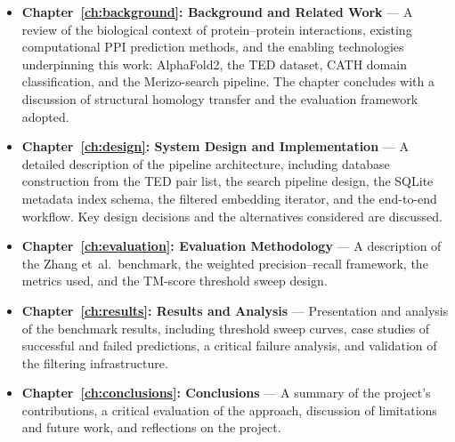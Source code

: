 \begin{itemize}
    \item \textbf{Chapter~\ref{ch:background}: Background and Related Work} ---
    A review of the biological context of protein--protein interactions, existing computational PPI prediction methods, and the enabling technologies underpinning this work: AlphaFold2, the TED dataset, CATH domain classification, and the Merizo-search pipeline.
    The chapter concludes with a discussion of structural homology transfer and the evaluation framework adopted.

    \item \textbf{Chapter~\ref{ch:design}: System Design and Implementation} ---
    A detailed description of the pipeline architecture, including database construction from the TED pair list, the search pipeline design, the SQLite metadata index schema, the filtered embedding iterator, and the end-to-end workflow.
    Key design decisions and the alternatives considered are discussed.

    \item \textbf{Chapter~\ref{ch:evaluation}: Evaluation Methodology} ---
    A description of the Zhang et~al.\ benchmark, the weighted precision--recall framework, the metrics used, and the TM-score threshold sweep design.

    \item \textbf{Chapter~\ref{ch:results}: Results and Analysis} ---
    Presentation and analysis of the benchmark results, including threshold sweep curves, case studies of successful and failed predictions, a critical failure analysis, and validation of the filtering infrastructure.

    \item \textbf{Chapter~\ref{ch:conclusions}: Conclusions} ---
    A summary of the project's contributions, a critical evaluation of the approach, discussion of limitations and future work, and reflections on the project.
\end{itemize}
